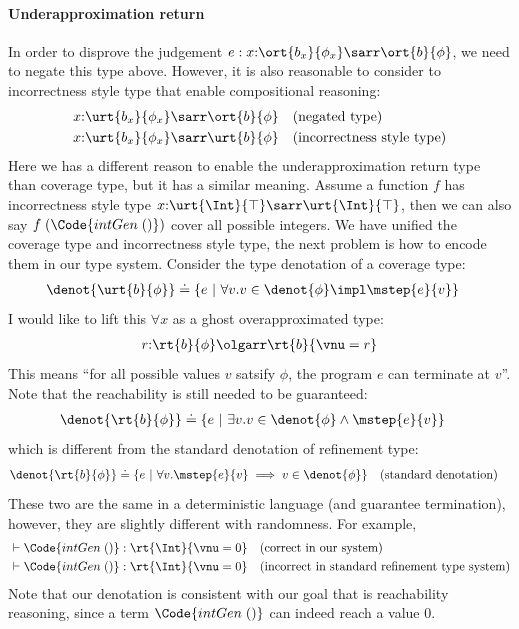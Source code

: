 \paragraph{Underapproximation return} In order to disprove the judgement $e : x{:}\ort{b_x}{\phi_x} \sarr \ort{b}{\phi}$, we need to negate this type above. However, it is also reasonable to consider to incorrectness style type that enable compositional reasoning:
\begin{align*}
    &x{:}\urt{b_x}{\phi_x} \sarr \ort{b}{\phi} \quad (\text{negated type})\\
    &x{:}\urt{b_x}{\phi_x} \sarr \urt{b}{\phi} \quad (\text{incorrectness style type})
\end{align*}\noindent
Here we has a different reason to enable the underapproximation return type than coverage type, but it has a similar meaning. Assume a function $f$ has incorrectness style type $x{:}\urt{\Int}{\top} \sarr \urt{\Int}{\top}$, then we can also say $f\;(\Code{intGen\;()})$ cover all possible integers.
We have unified the coverage type and incorrectness style type, the next problem is how to encode them in our type system. Consider the type denotation of a coverage type:
\begin{align*}
    \denot{\urt{b}{\phi}} &\doteq \{ e ~|~ \forall v. v \in \denot{\phi} \impl \mstep{e}{v} \}
\end{align*}\noindent
I would like to lift this $\forall x$ as a ghost overapproximated type:
\begin{align*}
    r{:}\rt{b}{\phi} \olgarr \rt{b}{\vnu = r}
\end{align*}\noindent
This means ``for all possible values $v$ satsify $\phi$, the program $e$ can terminate at $v$''. Note that the reachability is still needed to be guaranteed:
\begin{align*}
    \denot{\rt{b}{\phi}} &\doteq \{ e ~|~ \exists v. v \in \denot{\phi} \land \mstep{e}{v} \}
\end{align*}\noindent
which is different from the standard denotation of refinement type:
\begin{align*}
    \denot{\rt{b}{\phi}} &\doteq \{ e ~|~ \forall v. \mstep{e}{v} \implies v \in \denot{\phi} \} \quad (\text{standard denotation})
\end{align*}\noindent
These two are the same in a deterministic language (and guarantee termination), however, they are slightly different with randomness. For example,
\begin{align*}
    &\vdash \Code{intGen\;()} : \rt{\Int}{\vnu = 0} \quad (\text{correct in our system}) \\
    &\vdash \Code{intGen\;()} : \rt{\Int}{\vnu = 0} \quad (\text{incorrect in standard refinement type system})
\end{align*}\noindent
Note that our denotation is consistent with our goal that is reachability reasoning, since a term $\Code{intGen\;()}$ can indeed reach a value $0$.

